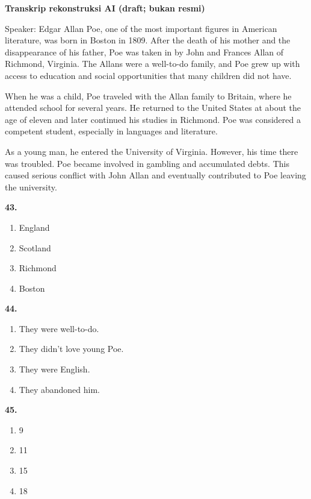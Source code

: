 \documentclass[12pt]{article}
\begin{document}
\begin{exampleblock}
\textbf{Transkrip rekonstruksi AI (draft; bukan resmi)}\par
Speaker: Edgar Allan Poe, one of the most important figures in American literature, was born in Boston in 1809. After the death of his mother and the disappearance of his father, Poe was taken in by John and Frances Allan of Richmond, Virginia. The Allans were a well-to-do family, and Poe grew up with access to education and social opportunities that many children did not have.\par
When he was a child, Poe traveled with the Allan family to Britain, where he attended school for several years. He returned to the United States at about the age of eleven and later continued his studies in Richmond. Poe was considered a competent student, especially in languages and literature.\par
As a young man, he entered the University of Virginia. However, his time there was troubled. Poe became involved in gambling and accumulated debts. This caused serious conflict with John Allan and eventually contributed to Poe leaving the university.\par
\end{exampleblock}
\noindent\textbf{43.}
\begin{enumerate}[label=(\Alph*),leftmargin=*,itemsep=0.2em]
\item England
\item Scotland
\item Richmond
\item Boston
\end{enumerate}
\par
\vspace{0.25\baselineskip}
\noindent\textbf{44.}
\begin{enumerate}[label=(\Alph*),leftmargin=*,itemsep=0.2em]
\item They were well-to-do.
\item They didn't love young Poe.
\item They were English.
\item They abandoned him.
\end{enumerate}
\par
\vspace{0.25\baselineskip}
\noindent\textbf{45.}
\begin{enumerate}[label=(\Alph*),leftmargin=*,itemsep=0.2em]
\item 9
\item 11
\item 15
\item 18
\end{enumerate}
\end{document}

